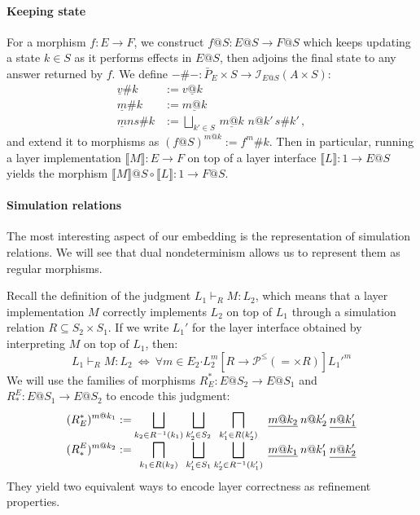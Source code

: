 \documentclass[sigplan,screen]{acmart}
\newcommand{\bdot}{\boldsymbol{\cdot}}
\begin{document}
\paragraph{Keeping state}
For a morphism $f : E \rightarrow F$,
we construct $f@S : E@S \rightarrow F@S$
which keeps updating a state $k \in S$
as it performs effects in $E@S$,
then adjoins the final state to any answer
returned by $f$.
We define
$-\#- : \bar{P}_E \times S \rightarrow \mathcal{I}_{E@S}(A \times S)$:
\begin{align*}
  \underline{v}\#k &:= \underline{v@k} \\
  \underline{m}\#k &:= \underline{m@k} \\
  \underline{m}ns\#k &:=
    \bigsqcup_{k' \in S} \, \underline{m@k} \,\, n@k' \, s\#k' \,,
\end{align*}
and extend it to morphisms as $(f@S)^{m@k} := f^m\#k$.
Then in particular,
running a layer implementation
$\llbracket M \rrbracket : E \rightarrow F$
on top of a layer interface
$\llbracket L \rrbracket : 1 \rightarrow E@S$
yields the morphism
$\llbracket M \rrbracket @ S \circ \llbracket L \rrbracket :
 1 \rightarrow F@S$.

\paragraph{Simulation relations}

The most interesting aspect of our embedding
is the representation of simulation relations.
We will see that dual nondeterminism
allows us to represent them as regular morphisms.

Recall the definition of
the judgment $L_1 \vdash_R M : L_2$,
which means that a layer implementation $M$
correctly implements $L_2$ on top of $L_1$
through a simulation relation $R \subseteq S_2 \times S_1$.
If we write $L_1'$ for the layer interface obtained
by interpreting $M$ on top of $L_1$,
then:
\[
  L_1 \vdash_R M : L_2 \:\Leftrightarrow\:
  \forall m \in E_2 \bdot
    L_2^m
    \mathrel{[R \rightarrow \mathcal{P}^\le({=} \times R)]}
    {L_1'}^m
\]
We will use the families of morphisms
$R^*_E : E@S_2 \rightarrow E@S_1$ and
$R_*^E : E@S_1 \rightarrow E@S_2$
to encode this judgment:
\[
  {\everymath={\displaystyle}
  \begin{array}{r@{\:}c@{\:}c@{\:}c@{\:}l}
  (R^*_E)^{m@k_1} := &
    \bigsqcup_{k_2 \in R^{-1}(k_1)} &
    \bigsqcup_{k_2' \in S_2} &
    \bigsqcap_{k_1' \in R(k_2')} &
    \: \underline{m@k_2} \: n@k_2' \: \underline{n@k_1'} \\
  (R_*^E)^{m@k_2} := &
    \bigsqcap_{k_1 \in R(k_2)} &
    \bigsqcup_{k_1' \in S_1} &
    \bigsqcup_{k_2' \in R^{-1}(k_1')} &
    \: \underline{m@k_1} \: n@k_1' \: \underline{n@k_2'}
  \end{array}}
\]
They yield two equivalent ways to encode
layer correctness as refinement properties.
\end{document}
